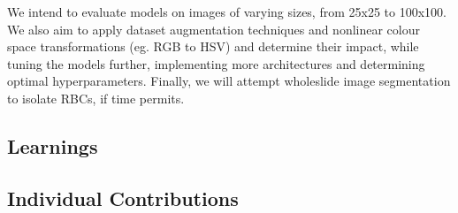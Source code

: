 \documentclass[10pt,twocolumn,letterpaper]{article}
\begin{document}
We intend to evaluate models on images of varying sizes, from 25x25 to 100x100. We also aim to apply dataset augmentation techniques and nonlinear colour space transformations (eg. RGB to HSV) and determine their impact, while tuning the models further, implementing more architectures and determining optimal hyperparameters. Finally, we will attempt wholeslide image segmentation to isolate RBCs, if time permits.


\subsection{Learnings}


\subsection{Individual Contributions}








\end{document}
